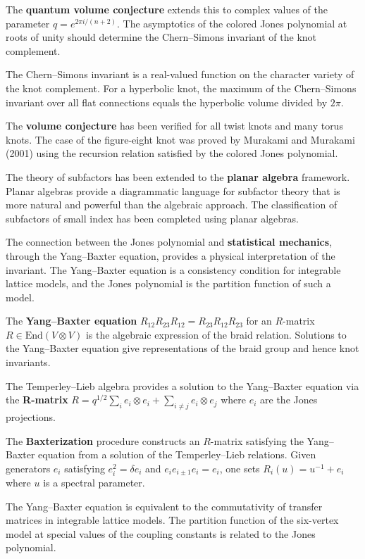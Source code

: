 The \textbf{quantum volume conjecture} extends this to complex values of the parameter $q = e^{2\pi i/(n+2)}$. The asymptotics of the colored Jones polynomial at roots of unity should determine the Chern--Simons invariant of the knot complement.

The Chern--Simons invariant is a real-valued function on the character variety of the knot complement. For a hyperbolic knot, the maximum of the Chern--Simons invariant over all flat connections equals the hyperbolic volume divided by $2\pi$.

The \textbf{volume conjecture} has been verified for all twist knots and many torus knots. The case of the figure-eight knot was proved by Murakami and Murakami (2001) using the recursion relation satisfied by the colored Jones polynomial.

The theory of subfactors has been extended to the \textbf{planar algebra} framework. Planar algebras provide a diagrammatic language for subfactor theory that is more natural and powerful than the algebraic approach. The classification of subfactors of small index has been completed using planar algebras.

The connection between the Jones polynomial and \textbf{statistical mechanics}, through the Yang--Baxter equation, provides a physical interpretation of the invariant. The Yang--Baxter equation is a consistency condition for integrable lattice models, and the Jones polynomial is the partition function of such a model.

The \textbf{Yang--Baxter equation} $R_{12} R_{23} R_{12} = R_{23} R_{12} R_{23}$ for an $R$-matrix $R \in \text{End}(V \otimes V)$ is the algebraic expression of the braid relation. Solutions to the Yang--Baxter equation give representations of the braid group and hence knot invariants.

The Temperley--Lieb algebra provides a solution to the Yang--Baxter equation via the \textbf{R-matrix} $R = q^{1/2} \sum_{i} e_i \otimes e_i + \sum_{i \neq j} e_i \otimes e_j$ where $e_i$ are the Jones projections.

The \textbf{Baxterization} procedure constructs an $R$-matrix satisfying the Yang--Baxter equation from a solution of the Temperley--Lieb relations. Given generators $e_i$ satisfying $e_i^2 = \delta e_i$ and $e_i e_{i\pm 1} e_i = e_i$, one sets $R_i(u) = u^{-1} + e_i$ where $u$ is a spectral parameter.

The Yang--Baxter equation is equivalent to the commutativity of transfer matrices in integrable lattice models. The partition function of the six-vertex model at special values of the coupling constants is related to the Jones polynomial.

